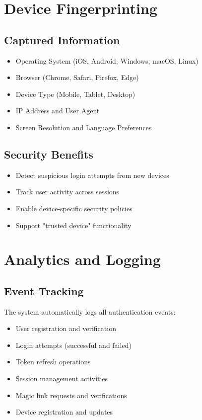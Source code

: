 \documentclass[12pt,a4paper]{article}
\begin{document}
\section{Device Fingerprinting}

\subsection{Captured Information}
\begin{itemize}
    \item Operating System (iOS, Android, Windows, macOS, Linux)
    \item Browser (Chrome, Safari, Firefox, Edge)
    \item Device Type (Mobile, Tablet, Desktop)
    \item IP Address and User Agent
    \item Screen Resolution and Language Preferences
\end{itemize}

\subsection{Security Benefits}
\begin{itemize}
    \item Detect suspicious login attempts from new devices
    \item Track user activity across sessions
    \item Enable device-specific security policies
    \item Support "trusted device" functionality
\end{itemize}

\section{Analytics and Logging}

\subsection{Event Tracking}
The system automatically logs all authentication events:

\begin{itemize}
    \item User registration and verification
    \item Login attempts (successful and failed)
    \item Token refresh operations
    \item Session management activities
    \item Magic link requests and verifications
    \item Device registration and updates
\end{itemize}
\end{document}
